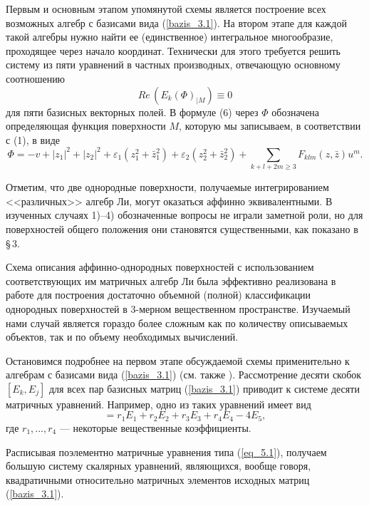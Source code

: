   Первым и основным этапом упомянутой схемы является построение всех
возможных алгебр
с базисами вида (\ref{bazis_3.1}). На втором этапе для каждой такой алгебры нужно найти
ее (единственное) интегральное многообразие, проходящее через начало координат.
Технически для этого требуется решить систему из пяти
уравнений в частных производных, отвечающую
основному соотношению
\begin{equation}
Re\,(E_k(\Phi)_{|M}) \equiv 0 \label{osnovnoe_tozhdestvo}
\end{equation}
для пяти базисных векторных полей. В формуле (6) через $ \Phi $ обозначена определяющая
функция поверхности $M $, которую мы записываем, в соответствии с (1), в виде
$$
  \Phi = -v + |z_1|^2 + |z_2|^2 + \varepsilon_1 (z_1^2 + \bar z_1^2) +
   \varepsilon_2 (z_2^2 + \bar z_2^2) +\sum_{k+l+2m \ge 3} F_{klm} (z,\bar z) u^m.
$$

\begin{remn} Отметим, что две однородные поверхности, получаемые интегрированием
<<различных>> алгебр Ли, могут оказаться аффинно эквивалентными.
  В изученных случаях 1)--4) обозначенные вопросы не играли заметной
роли, но для поверхностей общего положения они становятся существенными, как
показано в \S\,3.
\end{remn}

\begin{remn}
   Схема описания аффинно-однородных поверхностей с использованием соответствующих
им матричных алгебр Ли была эффективно реализована в работе
\cite{DoubrovKomRab} для построения достаточно объемной (полной) классификации
однородных поверхностей в 3-мерном вещественном пространстве. Изучаемый нами случай
является гораздо более сложным как по количеству описываемых объектов, так и
по объему необходимых вычислений.
\end{remn}


  Остановимся подробнее на первом этапе обсуждаемой схемы применительно к
алгебрам с базисами вида (\ref{bazis_3.1}) (см. также \cite{Ship15, LobShip}).
 Рассмотрение
десяти скобок $ [E_k, E_j] $ для всех пар базисных матриц (\ref{bazis_3.1})
приводит к системе десяти матричных уравнений. Например, одно из таких
уравнений имеет вид
\begin{equation}
  [E_1,E_2] =r_1 E_1 + r_2 E_2 + r_3 E_3 + r_4 E_4 - 4 E_5, \label{eq_5.1}
\end{equation}
где $ r_1, ... , r_4 $ --- некоторые вещественные коэффициенты.

  Расписывая поэлементно матричные уравнения типа (\ref{eq_5.1}),
получаем большую систему скалярных уравнений, являющихся, вообще говоря,
квадратичными относительно матричных элементов исходных матриц  (\ref{bazis_3.1}).

